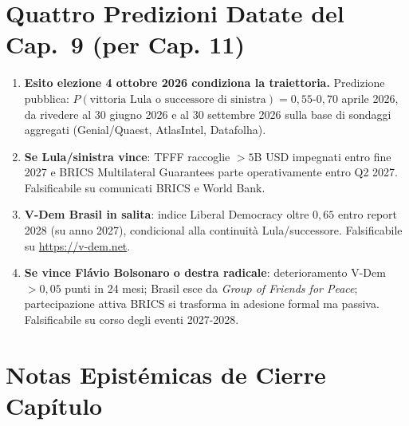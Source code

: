 \section{Quattro Predizioni Datate del Cap.~9 (per Cap.
11)}\label{quattro-predizioni-datate-del-cap.-9-per-cap.-11}

\begin{enumerate}
\def\labelenumi{\arabic{enumi}.}
\tightlist
\item
  \textbf{Esito elezione 4 ottobre 2026 condiziona la traiettoria.}
  Predizione pubblica:
  \(P(\text{vittoria Lula o successore di sinistra}) = 0{,}55\)-\(0{,}70\)
  aprile 2026, da rivedere al 30 giugno 2026 e al 30 settembre 2026
  sulla base di sondaggi aggregati (Genial/Quaest, AtlasIntel,
  Datafolha).
\item
  \textbf{Se Lula/sinistra vince}: TFFF raccoglie \(> 5\)B USD impegnati
  entro fine 2027 e BRICS Multilateral Guarantees parte operativamente
  entro Q2 2027. Falsificabile su comunicati BRICS e World Bank.
\item
  \textbf{V-Dem Brasil in salita}: indice Liberal Democracy oltre
  \(0{,}65\) entro report 2028 (su anno 2027), condicional alla
  continuità Lula/successore. Falsificabile su \url{https://v-dem.net}.
\item
  \textbf{Se vince Flávio Bolsonaro o destra radicale}: deterioramento
  V-Dem \(> 0{,}05\) punti in 24 mesi; Brasil esce da \emph{Group of
  Friends for Peace}; partecipazione attiva BRICS si trasforma in
  adesione formal ma passiva. Falsificabile su corso degli eventi
  2027-2028.
\end{enumerate}



\section{Notas Epistémicas de Cierre
Capítulo}\label{note-epistemiche-di-chiusura-capítulo}

